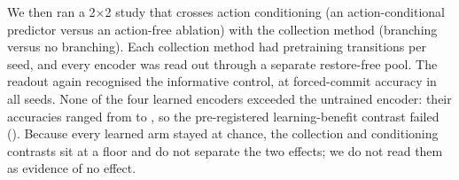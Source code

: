 We then ran a 2$\times$2 study that crosses action conditioning (an action-conditional predictor versus an action-free ablation) with the collection method (branching versus no branching). Each collection method had \StudyCfgPretrainBudget{} pretraining transitions per seed, and every encoder was read out through a separate restore-free pool. The readout again recognised the informative control, at forced-commit accuracy \StudyForcedInfoMin{} in all seeds. None of the four learned encoders exceeded the untrained encoder: their accuracies ranged from \StudyForcedLearnedMin{} to \StudyForcedLearnedMax{}, so the pre-registered learning-benefit contrast failed (\StudyVerdict). Because every learned arm stayed at chance, the collection and conditioning contrasts sit at a floor and do not separate the two effects; we do not read them as evidence of no effect.